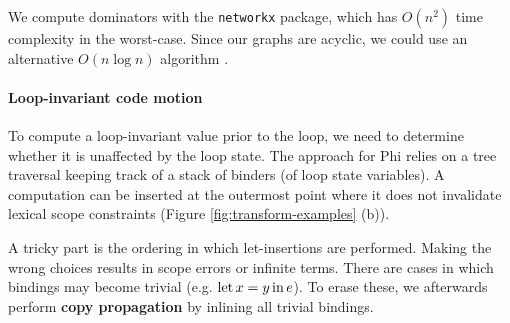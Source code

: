 We compute dominators with the \texttt{networkx} package, which has $O(n^2)$ time complexity in the worst-case. Since our graphs are acyclic, we could use an alternative $O(n \log n)$ algorithm \cite{ramalingam1994incremental}.

\vspace{-1em}
\paragraph{Loop-invariant code motion} To compute a loop-invariant value prior to the loop, we need to determine whether it is unaffected by the loop state. The approach for Phi relies on a tree traversal keeping track of a stack of binders (of loop state variables). A computation can be inserted at the outermost point where it does not invalidate lexical scope constraints (Figure \ref{fig:transform-examples} (b)).

A tricky part is the ordering in which let-insertions are performed. Making the wrong choices results in scope errors or infinite terms. 
There are cases in which bindings may become trivial (e.g. $\mathrm{let}\,{x}={y}\,\mathrm{in}\,{e}$). To erase these, we afterwards perform \textbf{copy propagation} by inlining all trivial bindings.



